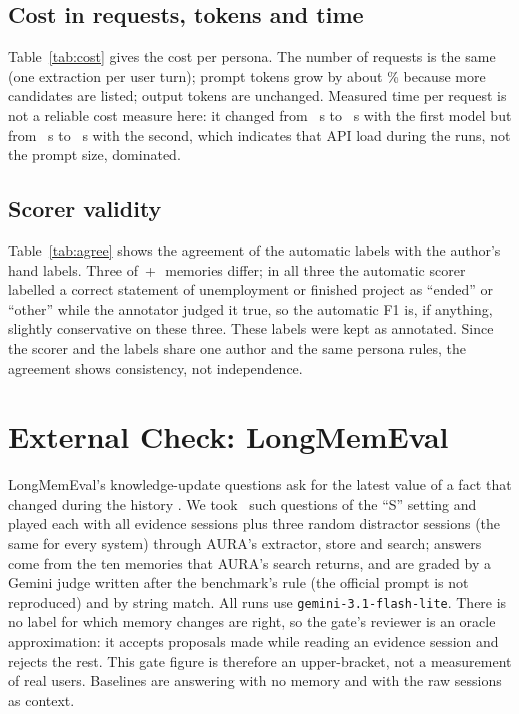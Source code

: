 \IfFileExists{IEEEtran.cls}{\documentclass[journal]{IEEEtran}\def\HAVEIEEE{1}}{\documentclass[10pt,twocolumn]{article}\usepackage[margin=0.7in,columnsep=0.25in]{geometry}}
\newcommand{\aura}{AURA}
\begin{document}
\subsection{Cost in requests, tokens and time}
Table~\ref{tab:cost} gives the cost per persona. The number of requests is the same (one extraction per user turn); prompt tokens grow by about \tokInc\% because more candidates are listed; output tokens are unchanged. Measured time per request is not a reliable cost measure here: it changed from \latBaseA\ s to \latBothA\ s with the first model but from \latBaseB\ s to \latBothB\ s with the second, which indicates that API load during the runs, not the prompt size, dominated.

\begin{table}[!t]
\centering\small
\caption{Cost per persona (gate policy; means over 12 personas).}
\label{tab:cost}
\end{table}

\subsection{Scorer validity}
Table~\ref{tab:agree} shows the agreement of the automatic labels with the author's hand labels. Three of \agrBaseN\,+\,\agrBothN\ memories differ; in all three the automatic scorer labelled a correct statement of unemployment or finished project as ``ended'' or ``other'' while the annotator judged it true, so the automatic F1 is, if anything, slightly conservative on these three. These labels were kept as annotated. Since the scorer and the labels share one author and the same persona rules, the agreement shows consistency, not independence.

\begin{table}[t]
\centering\small
\caption{Agreement between automatic and hand labels (single annotator).}
\label{tab:agree}
\end{table}

\section{External Check: LongMemEval}
\label{sec:lme}
LongMemEval's knowledge-update questions ask for the latest value of a fact that changed during the history \cite{wu2024longmemeval}. We took \lmeQ\ such questions of the ``S'' setting and played each with all evidence sessions plus three random distractor sessions (the same for every system) through \aura's extractor, store and search; answers come from the ten memories that \aura's search returns, and are graded by a Gemini judge written after the benchmark's rule (the official prompt is not reproduced) and by string match. All runs use \texttt{gemini-3.1-flash-lite}. There is no label for which memory changes are right, so the gate's reviewer is an oracle approximation: it accepts proposals made while reading an evidence session and rejects the rest. This gate figure is therefore an upper-bracket, not a measurement of real users. Baselines are answering with no memory and with the raw sessions as context.
\end{document}
